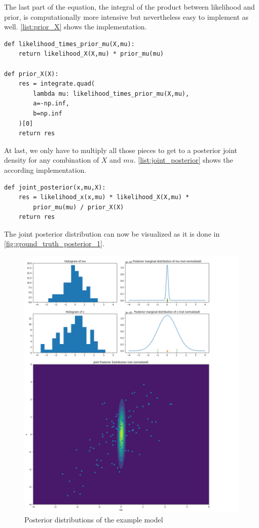 \documentclass{article}
\begin{document}
The last part of the equation, the integral of the product between likelihood and prior, is computationally more intensive but nevertheless easy to implement as well. \autoref{list:prior_X} shows the implementation.
\begin{lstlisting}[caption={Implementation of the prior for X}, label={list:prior_X},captionpos=b]
def likelihood_times_prior_mu(X,mu):
    return likelihood_X(X,mu) * prior_mu(mu)
	
def prior_X(X):
    res = integrate.quad(
        lambda mu: likelihood_times_prior_mu(X,mu),
        a=-np.inf,
        b=np.inf
    )[0]
    return res
\end{lstlisting}
At last, we only have to multiply all those pieces to get to a posterior joint density for any combination of $X$ and $mu$. \autoref{list:joint_posterior} shows the according implementation.
\begin{lstlisting}[caption={Implementation of the joint posterior distribution}, label={list:joint_posterior},captionpos=b]
def joint_posterior(x,mu,X):
    res = likelihood_x(x,mu) * likelihood_X(X,mu) * 
        prior_mu(mu) / prior_X(X)
    return res
\end{lstlisting}
The joint posterior distribution can now be visualized as it is done in \autoref{fig:ground_truth_posterior_1}.
\begin{figure}
	\includegraphics[width=\textwidth]{images/ground_truth_posterior_1_cut.png}
	\caption[Posterior distributions of the example model]{Posterior distributions of the example model}
	\label{fig:ground_truth_posterior_1}
\end{figure}
\end{document}
